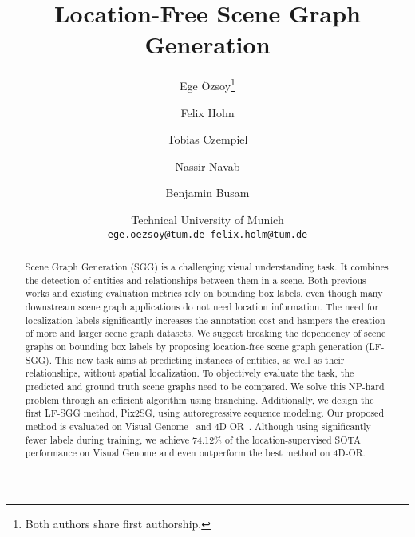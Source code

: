 \documentclass[10pt,twocolumn,letterpaper]{article}
\begin{document}
\title{Location-Free Scene Graph Generation}

\author{Ege Özsoy\thanks{Both authors share first authorship.}\\
\and
Felix Holm\textsuperscript{\textasteriskcentered}\\
\and
Tobias Czempiel\\
\and
Nassir Navab\\
\and
Benjamin Busam\\
\and
Technical University of Munich\\
{\tt\small ege.oezsoy@tum.de  felix.holm@tum.de}
}



\ificcvfinal\thispagestyle{empty}\fi


 \begin{abstract}
   Scene Graph Generation (SGG) is a challenging visual understanding task. It combines the detection of entities and relationships between them in a scene. Both previous works and existing evaluation metrics rely on bounding box labels, even though many downstream scene graph applications do not need location information. The need for localization labels significantly increases the annotation cost and hampers the creation of more and larger scene graph datasets. We suggest breaking the dependency of scene graphs on bounding box labels by proposing location-free scene graph generation (LF-SGG). This new task aims at predicting instances of entities, as well as their relationships, without spatial localization. To objectively evaluate the task, the predicted and ground truth scene graphs need to be compared. We solve this NP-hard problem through an efficient algorithm using branching. Additionally, we design the first LF-SGG method, Pix2SG, using autoregressive sequence modeling. Our proposed method is evaluated on Visual Genome~\cite{krishna_visual_2016} and 4D-OR~\cite{ozsoy_4d-or_2022}. Although using significantly fewer labels during training, we achieve 74.12\% of the location-supervised SOTA performance on Visual Genome and even outperform the best method on 4D-OR.
   
   \renewcommand{\thefootnote}{\fnsymbol{footnote}}
\end{abstract}
\end{document}
